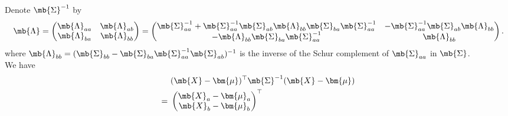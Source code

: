 \begin{exercise}
\begin{enumerate}
            \begin{solution}
                Denote $\mb{\Sigma}^{-1}$ by
                \begin{align*}
                    \mb{\Lambda} = 
                    \begin{pmatrix}
                        \mb{\Lambda}_{aa} & \mb{\Lambda}_{ab} \\
                        \mb{\Lambda}_{ba} & \mb{\Lambda}_{bb}
                    \end{pmatrix} =
                    \begin{pmatrix}
                        \mb{\Sigma}_{aa}^{-1} + \mb{\Sigma}_{aa}^{-1}\mb{\Sigma}_{ab}\mb{\Lambda}_{bb}\mb{\Sigma}_{ba}\mb{\Sigma}_{aa}^{-1} & -\mb{\Sigma}_{aa}^{-1}\mb{\Sigma}_{ab}\mb{\Lambda}_{bb} \\
                        -\mb{\Lambda}_{bb}\mb{\Sigma}_{ba}\mb{\Sigma}_{aa}^{-1}                                                             & \mb{\Lambda}_{bb}
                    \end{pmatrix}.
                \end{align*}
                where $\mb{\Lambda}_{bb}=(\mb{\Sigma}_{bb}-\mb{\Sigma}_{ba}\mb{\Sigma}_{aa}^{-1}\mb{\Sigma}_{ab})^{-1}$ is the inverse of the Schur complement of $\mb{\Sigma}_{aa}$ in $\mb{\Sigma}$.\\
                We have
                \begin{align*}
                        & (\mb{X}-\bm{\mu})^{\top}\mb{\Sigma}^{-1}(\mb{X}-\bm{\mu})                                                                                                                                             \\
                    =\  & 
                    \begin{pmatrix}
                        \mb{X}_a - \bm{\mu}_a \\ \mb{X}_b - \bm{\mu}_b
                    \end{pmatrix}^\top 

\end{align*}
\end{solution}
\end{enumerate}
\end{exercise}
